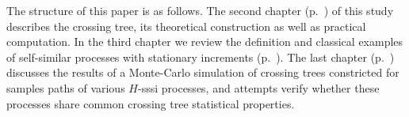 \documentclass[a4paper,14pt]{extreport}
\begin{document}
The structure of this paper is as follows. The second chapter (p.~\pageref{cha:the_crossing_tree})
of this study describes the crossing tree, its theoretical construction as well as practical
computation. In the third chapter we review the definition and classical examples
of self-similar processes with stationary increments (p.~\pageref{cha:h_sssi_processes}).
The last chapter (p.~\pageref{cha:the_crossing_tree_and_h_sssi_processes}) discusses
the results of a Monte-Carlo simulation of crossing trees constricted for samples paths
of various $H$-sssi processes, and attempts verify whether these processes share
common crossing tree statistical properties.


\clearpage


\clearpage


\clearpage


\clearpage



\clearpage


% 




\end{document}
